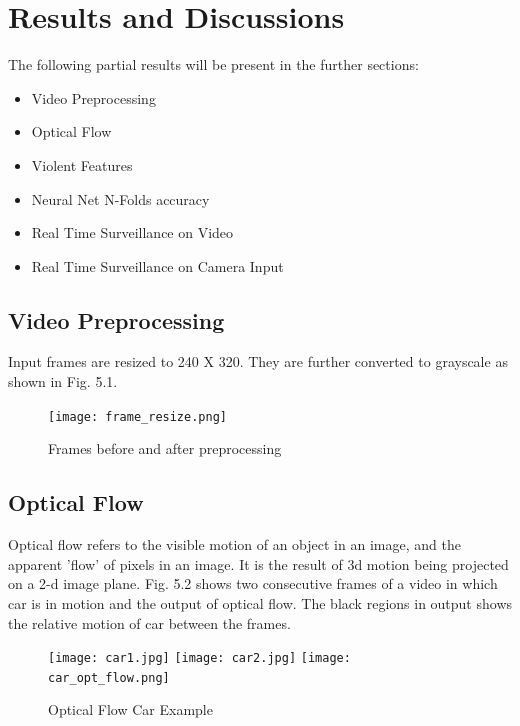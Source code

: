 \clearpage
\chapter{Results and Discussions}
The following partial results will be present in the further sections:
\begin{itemize}
	\item Video Preprocessing
	\item Optical Flow
	\item Violent Features
	\item Neural Net N-Folds accuracy
	\item Real Time Surveillance on Video
	\item Real Time Surveillance on Camera Input
\end{itemize}
\section{Video Preprocessing}
 Input frames are resized to 240 X 320. They are further converted to grayscale as shown in Fig. 5.1.
\begin{center}
\begin{figure}[H]
\centering
\texttt{[image: frame\_resize.png]}
\caption{Frames before and after preprocessing}
\end{figure}
\end{center}
\section{Optical Flow}
Optical flow refers to the visible motion of an object in an image, and the apparent 'flow' of pixels in an image. It is the result of 3d motion being projected on a 2-d image plane. Fig. 5.2 shows two consecutive frames of a video in which car is in motion and the output of optical flow. The black regions in output shows the relative motion of car between the frames.
\begin{figure}[htp]
\centering
\texttt{[image: car1.jpg]}\hfill
\texttt{[image: car2.jpg]}\hfill
\texttt{[image: car\_opt\_flow.png]}
\caption{Optical Flow Car Example}
\end{figure}
